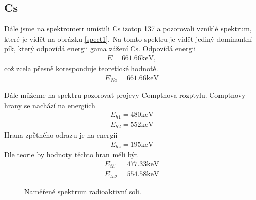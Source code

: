 \documentclass[a4paper,12pt]{article}
\begin{document}
\subsection{Cs}
Dále jsme na spektrometr umístili Cs izotop 137 a pozorovali vzniklé spektrum, které je vidět na obrázku \ref{spect1}. 
Na tomto spektru je vidět jediný dominantní pík, který odpovídá energii gama zážení Cs. Odpovídá energii
\begin{eqnarray}
E=661.66 \mbox{keV},
\end{eqnarray}
což zcela přesně koresponduje teoretické hodnotě.
\begin{eqnarray}
E_{Na}=661.66\mbox{keV}
\end{eqnarray}

Dále můžeme na spektru pozorovat projevy Comptnova rozptylu. Comptnovy hrany se nachází na energiích
\begin{eqnarray}
E_{h1}=480 \mbox{keV} \\
E_{h2}=552 \mbox{keV}
\end{eqnarray}
Hrana zpětného odrazu je na energii
\begin{eqnarray}
E_{hz}=195 \mbox{keV}
\end{eqnarray}
Dle teorie by hodnoty těchto hran měli být
\begin{eqnarray}
E_{th1}=477.33 \mbox{keV} \\
E_{th2}=554.58 \mbox{keV}
\end{eqnarray}

\begin{figure}
\begin{center}

\end{center}
\caption{Naměřené spektrum radioaktivní soli.}
\label{spect2}
\end{figure}
\end{document}
